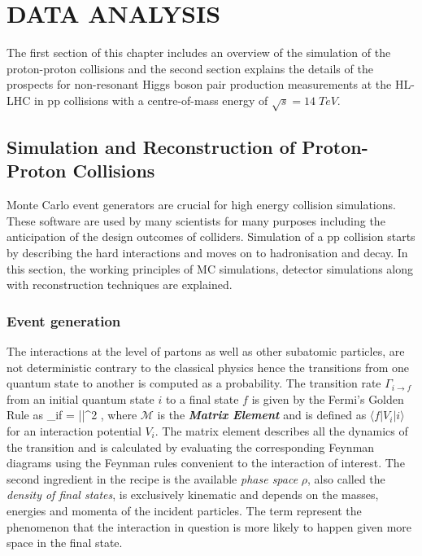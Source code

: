 \chapter{DATA ANALYSIS}\label{ch3}

The first section of this chapter includes an overview of the simulation of the proton-proton collisions and the second section explains the details of the prospects for non-resonant Higgs boson pair production measurements at the HL-LHC in pp collisions with a centre-of-mass energy of $\sqrt{s}=14\;TeV$.

\section{Simulation and Reconstruction of Proton-Proton Collisions}
Monte Carlo event generators are crucial for high energy collision simulations. These software are used by many scientists for many purposes including the anticipation of the design outcomes of colliders. Simulation of a pp collision starts by describing the hard interactions and moves on to hadronisation and decay. In this section, the working principles of MC simulations, detector simulations along with reconstruction techniques are explained.

\subsection{Event generation}

The interactions at the level of partons as well as other subatomic particles, are not deterministic contrary to the classical physics hence the transitions from one quantum state to another is computed as a probability. The transition rate $\Gamma_{i\rightarrow f}$ from an initial quantum state $i$ to a final state $f$ is given by the Fermi's Golden Rule as
\be
\Gamma_{i\rightarrow f} = \frac{2\pi}{\hbar}||^2 \rho \; ,
\ee
where $\mathcal{M}$ is the \emph{\textbf{Matrix Element}} and is defined as $\langle f|V_i|i\rangle$ for an interaction potential $V_i$. The matrix element describes all the dynamics of the transition and is calculated by evaluating the corresponding Feynman diagrams using the Feynman rules convenient to the interaction of interest. The second ingredient in the recipe is the available \emph{phase space} $\rho$, also called the \emph{density of final states}, is exclusively kinematic and depends on the masses, energies and momenta of the incident particles. The term represent the phenomenon that the interaction in question is more likely to happen given more space in the final state.

